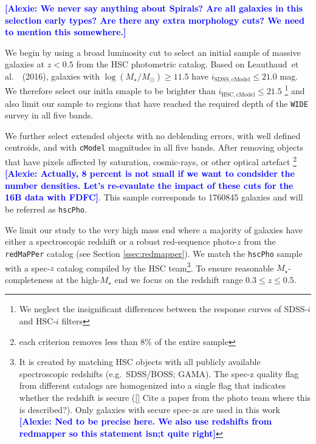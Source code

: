 \documentclass{emulateapj}
\def\etal{{\ et al.~}}
\def\redm{\texttt{redMaPPer}}
\def\mstar{{$M_{\star}$}}
\def\logms{{$\log (M_{\star}/M_{\odot})$}}
\newcommand{\alexie}[1]{\textcolor{blue}{\textbf{[Alexie: #1]}}}
\newcommand{\update}[1]{\textcolor{Bittersweet}{#1}}
\begin{document}
\begin{CJK*}{UTF8}{gbsn}
    
    \alexie{We never say anything about Spirals? Are all galaxies in this selection early types? Are there any extra morphology cuts? We need to mention this somewhere.}
    
    \update{
    We begin by using a broad luminosity cut to select an initial sample of massive galaxies at $z < 0.5$
    from the HSC photometric catalog.} Based on Leauthaud\etal~(2016), galaxies with \logms{}$\geq 11.5$ have 
    $i_{\mathrm{SDSS, cModel}} \leq 21.0$ mag. We therefore select our initla smaple to be brighter than  $i_{\mathrm{HSC, cModel}} \leq 21.5$ 
    \footnote{We neglect the insignificant differences between the response curves of
    SDSS-$i$ and HSC-$i$ filters} and also limit our sample to regions that have reached the required depth of the \texttt{WIDE} survey in all 
    five bands. 
    
    We further select extended objects with no deblending errors, with well defined 
    centroids, and with \texttt{cModel} magnitudes in all five bands. 
    After removing objects that have pixels affected by saturation, cosmic-rays, or 
    other optical artefact \footnote{each criterion removes less than 8\% of the entire
    sample} \alexie{Actually, 8 percent is not small if we want to condsider the number densities. Let's re-evaulate the impact of these cuts for the 16B data with FDFC}. This sample corresponds to 1760845 galaxies and will be referred as \texttt{hscPho}. 
    
    
        
    We limit our study to the very high mass end where a majority of galaxies have either a  spectroscopic redshift or a robust 
    red-sequence photo-$z$ from the \redm{} catalog (see Section \ref{ssec:redmapper}).  
    We match the \texttt{hscPho} sample with a spec-$z$ catalog 
    compiled by the HSC team\footnote{It is created by matching HSC objects with all publicly available spectroscopic redshifts (e.g.\ SDSS/BOSS; GAMA). The spec-z quality flag from different catalogs 
    are homogenized into a single flag that indicates whether the redshift is secure (\ref{} Cite a paper from the photo team where this is described?). Only galaxies with secure spec-$z$s are used in this work \alexie{Ned to be precise here. We also use redshifts from redmapper so this statement isn;t quite right}}.  To ensure reasonable 
    \mstar{}-completeness at the high-\mstar{} end we focus on the redshift range $0.3 \leq z \leq 0.5$. 
        

\end{CJK*}
\end{document}

